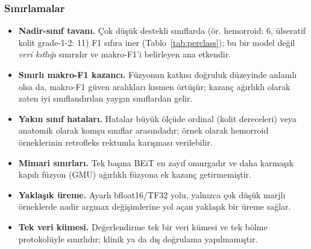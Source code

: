 \subsubsection{Sınırlamalar}
\begin{itemize}
  \item \textbf{Nadir-sınıf tavanı.} Çok düşük destekli sınıflarda (ör. hemorroid:
        6, ülseratif kolit grade-1-2: 11) F1 sıfıra iner
        (Tablo~\ref{tab:perclass}); bu bir model değil \emph{veri kıtlığı}
        sınırıdır ve makro-F1'i belirleyen ana etkendir.
  \item \textbf{Sınırlı makro-F1 kazancı.} Füzyonun katkısı doğruluk düzeyinde
        anlamlı olsa da, makro-F1 güven aralıkları kısmen örtüşür; kazanç ağırlıklı
        olarak zaten iyi sınıflandırılan yaygın sınıflardan gelir.
  \item \textbf{Yakın sınıf hataları.} Hatalar büyük ölçüde ordinal (kolit
        dereceleri) veya anatomik olarak komşu sınıflar arasındadır; örnek olarak
        hemorroid örneklerinin retrofleks rektumla karışması verilebilir.
  \item \textbf{Mimari sınırları.} Tek başına BEiT en zayıf omurgadır ve daha karmaşık
        kapılı füzyon (GMU) ağırlıklı füzyona ek kazanç getirmemiştir.
  \item \textbf{Yaklaşık üreme.} Ayarlı bfloat16/TF32 yolu, yalnızca çok düşük marjlı
        örneklerde nadir argmax değişimlerine yol açan yaklaşık bir üreme sağlar.
  \item \textbf{Tek veri kümesi.} Değerlendirme tek bir veri kümesi ve tek bölme
        protokolüyle sınırlıdır; klinik ya da dış doğrulama yapılmamıştır.
\end{itemize}
